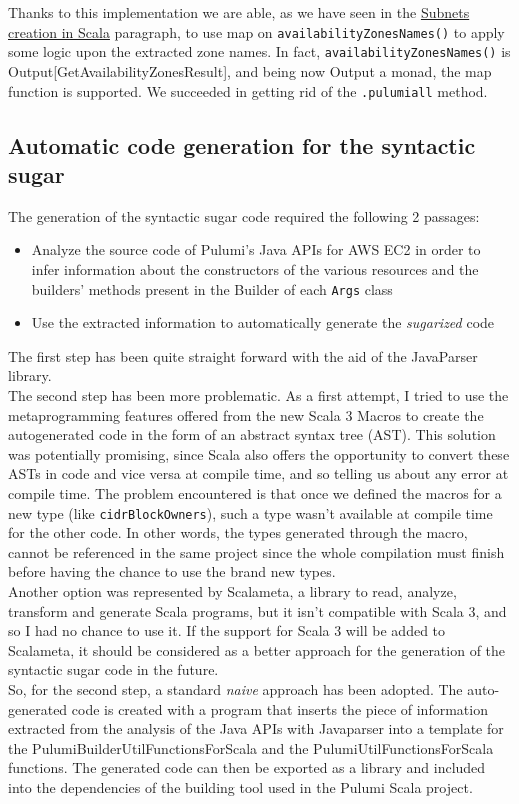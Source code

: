 Thanks to this implementation we are able, as we have seen in the \hyperref[sssec:subnets-creation]{Subnets creation in Scala} paragraph, to use map on \texttt{availabilityZonesNames()} to apply some logic upon the extracted zone names.
In fact, \texttt{availabilityZonesNames()} is Output[GetAvailabilityZonesResult], and being now Output a monad, the map function is supported.
We succeeded in getting rid of the \texttt{.pulumiall} method.

\subsection{Automatic code generation for the syntactic sugar}
The generation of the syntactic sugar code required the following 2 passages:
\begin{itemize}
  \item Analyze the source code of Pulumi's Java APIs for AWS EC2 in order to infer information about the constructors of the various resources and the builders' methods present in the Builder of each \texttt{Args} class
  \item Use the extracted information to automatically generate the \textit{sugarized} code
\end{itemize}
The first step has been quite straight forward with the aid of the JavaParser library.\\
The second step has been more problematic.
As a first attempt, I tried to use the metaprogramming features offered from the new Scala 3 Macros to create the autogenerated code in the form of an \gls{abstract syntax tree} (AST).
This solution was potentially promising, since Scala also offers the opportunity to convert these ASTs in code and vice versa at compile time, and so telling us about any error at compile time.
The problem encountered is that once we defined the macros for a new type (like \texttt{cidrBlockOwners}), such a type wasn't available at compile time for the other code.
In other words, the types generated through the macro, cannot be referenced in the same project since the whole compilation must finish before having the chance to use the brand new types.\\
Another option was represented by Scalameta, a library to read, analyze, transform and generate Scala programs, but it isn't compatible with Scala 3, and so I had no chance to use it.
If the support for Scala 3 will be added to Scalameta, it should be considered as a better approach for the generation of the syntactic sugar code in the future.\\
So, for the second step, a standard \textit{naive} approach has been adopted.
The auto-generated code is created with a program that inserts the piece of information extracted from the analysis of the Java APIs with Javaparser into a template for the PulumiBuilderUtilFunctionsForScala and the PulumiUtilFunctionsForScala functions.
The generated code can then be exported as a library and included into the dependencies of the building tool used in the Pulumi Scala project.

